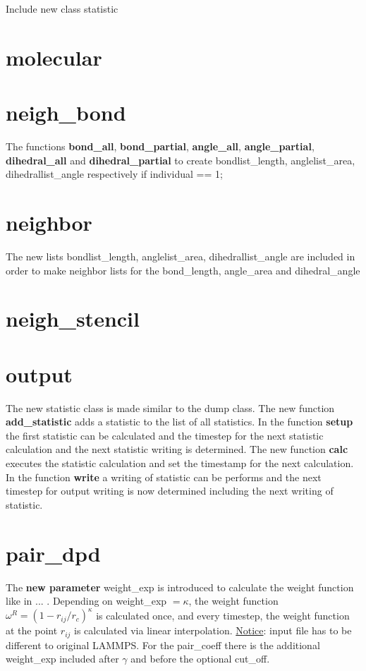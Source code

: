 \documentclass[a4paper,10pt]{scrreprt}
\begin{document}
Include new class statistic


\section{molecular}


\section{neigh\_bond}

The functions \textbf{bond\_all}, \textbf{bond\_partial}, \textbf{angle\_all}, \textbf{angle\_partial}, \textbf{dihedral\_all} and \textbf{dihedral\_partial} to create bondlist\_length, anglelist\_area, dihedrallist\_angle respectively if individual == 1;


\section{neighbor}

The new lists bondlist\_length, anglelist\_area, dihedrallist\_angle are included in order to make neighbor lists for the bond\_length, angle\_area and dihedral\_angle


\section{neigh\_stencil}


\section{output}

The new statistic class is made similar to the dump class. The new function \textbf{add\_sta\-tist\-ic} adds a statistic to the list of all statistics. In the function \textbf{setup} the first statistic can be calculated and the timestep for the next statistic calculation and the next statistic writing is determined. The new function \textbf{calc} executes the statistic calculation and set the timestamp for the next calculation. In the function \textbf{write} a writing of statistic can be performs and the next timestep for output writing is now determined including the next writing of statistic.


\section{pair\_dpd}

The \textbf{new parameter} weight\_exp is introduced to calculate the weight function like in ... . Depending on weight\_exp $=\kappa$, the weight function $\omega^R = \left(1-r_{ij}/r_c\right)^{\kappa}$ is calculated once, and every timestep, the weight function at the point $r_{ij}$ is calculated via linear interpolation.
\underline{Notice}: input file has to be different to original LAMMPS. For the pair\_coeff there is the additional weight\_exp included after $\gamma$ and before the optional cut\_off.
\end{document}
